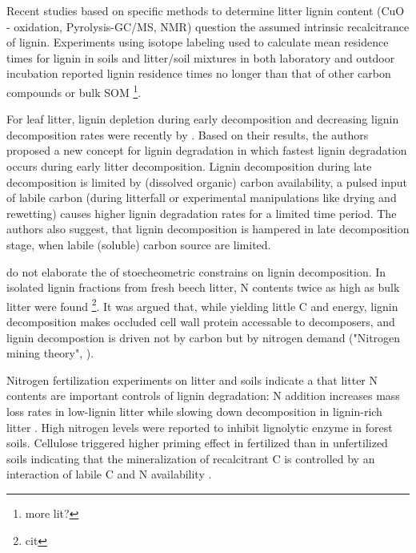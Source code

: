 \documentclass[10pt]{article}
\begin{document}
Recent studies based on specific methods to determine litter lignin content (CuO - oxidation, Pyrolysis-GC/MS, NMR) question the assumed intrinsic recalcitrance of lignin. Experiments using isotope labeling used to calculate mean residence times for lignin in soils and litter/soil mixtures in both laboratory and outdoor incubation reported lignin residence times no longer than that of other carbon compounds or bulk SOM \cite{Thevenot2010a, Bol2009}\footnote{more lit?}.

For leaf litter, lignin depletion during early decomposition and decreasing lignin decomposition rates were recently by \cite{Klotzbucher2011}. Based on their results, the authors proposed a new concept for lignin degradation in which fastest lignin degradation occurs during early litter decomposition. Lignin decomposition during late decomposition is limited by (dissolved organic) carbon availability, a pulsed input of labile carbon (during litterfall or experimental manipulations like drying and rewetting) causes higher lignin degradation rates for a limited time period. The authors also suggest, that lignin decomposition is hampered in late decomposition stage, when labile (soluble) carbon source are limited. %

\cite{Klotzbucher2011} do not elaborate the of stoecheometric constrains on lignin decomposition. In isolated lignin fractions from fresh beech litter, N contents twice as high as bulk litter were found \footnote{cit}. It was argued that, while yielding little C and energy, lignin decomposition makes occluded cell wall protein accessable to decomposers, and lignin decompostion is driven not by carbon but by nitrogen demand ("Nitrogen mining theory", \cite{Craine2007}). 

Nitrogen fertilization experiments on litter and soils indicate a that litter N contents are important controls of lignin degradation: N addition increases mass loss rates in low-lignin litter while slowing down decomposition in lignin-rich litter \cite{Knorr2005}. High nitrogen levels were reported to inhibit lignolytic enzyme in forest soils\cite{Sinsabaugh2010}. Cellulose triggered higher priming effect in fertilized than in unfertilized soils indicating that the mineralization of recalcitrant C is controlled by an interaction of labile C and N availability \cite{Fontaine2011}.
\end{document}
